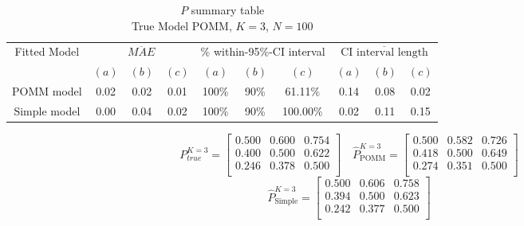 \documentclass[11pt]{amsart}
\begin{document}
\begin{table}[htbp]
\centering
\caption*{
{\large $P$ summary table} \\ 
{\small True Model POMM, $K=3$, $N=100$}
} 
\begin{tabular}{cccccccccc}
\toprule
\multirow{2}{*}{Fitted Model} & \multicolumn{3}{c}{
$\overline{MAE}$ } & \multicolumn{3}{c}{
$\%$ within-95\%-CI interval} & \multicolumn{3}{c}{ $\overline{\text{CI interval length}}$} \\
\cmidrule(lr){2-4} \cmidrule(lr){5-7} \cmidrule(lr){8-10}
& $(a)$ & $(b)$ & $(c)$ & $(a)$ & $(b)$ & $(c)$ & $(a)$ & $(b)$ & $(c)$ \\
\midrule
POMM model  &0.02 & 0.02 & 0.01 & 100\% & 90\% & 61.11\% & 0.14 & 0.08 & 0.02  \\
Simple model & 0.00 & 0.04 & 0.02 & 100\% & 90\% & 100.00\% & 0.02 & 0.11 & 0.15 \\
\bottomrule
\end{tabular}
\label{table:simulations_from_simple}
\end{table}

\newpage
\[
P^{K=3}_{true} = 
\left[\begin{array}{ccc}
0.500 & 0.600 & 0.754 \\
0.400 & 0.500 & 0.622 \\
0.246 & 0.378 & 0.500 \\ 
\end{array}\right] \quad 
\hat{P}^{K=3}_{\text{POMM}} = 
\left[\begin{array}{ccc}
0.500 & 0.582 & 0.726 \\
0.418 & 0.500 & 0.649 \\
0.274 & 0.351 & 0.500 \\ 
\end{array}\right] 
\]
\[ 
\hat{P}^{K=3}_{\text{Simple}} = 
\left[\begin{array}{ccc}
0.500 & 0.606 & 0.758 \\
0.394 & 0.500 & 0.623 \\
0.242 & 0.377 & 0.500 \\ 
\end{array}\right]
\]
\end{document}
